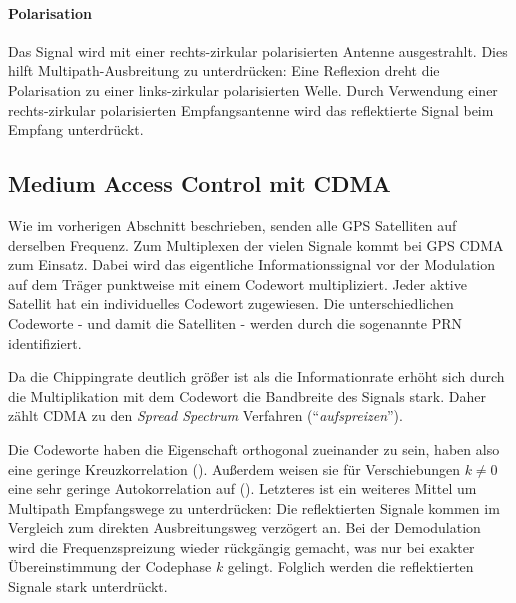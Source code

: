 
\paragraph{Polarisation} Das Signal wird mit einer rechts-zirkular polarisierten Antenne ausgestrahlt. Dies hilft Multipath-Ausbreitung zu unterdrücken: Eine Reflexion dreht die Polarisation zu einer links-zirkular polarisierten Welle. Durch Verwendung einer rechts-zirkular polarisierten Empfangsantenne wird das reflektierte Signal beim Empfang unterdrückt.

\subsection{Medium Access Control mit CDMA}
\label{basics_cdma}

Wie im vorherigen Abschnitt beschrieben, senden alle GPS Satelliten auf derselben Frequenz. Zum Multiplexen der vielen Signale kommt bei GPS \gls{CDMA} zum Einsatz. Dabei wird das eigentliche Informationssignal vor der Modulation auf dem Träger punktweise mit einem Codewort multipliziert. Jeder aktive Satellit hat ein individuelles Codewort zugewiesen. Die unterschiedlichen Codeworte - und damit die Satelliten - werden durch die sogenannte \gls{PRN} identifiziert.

Da die Chippingrate deutlich größer ist als die Informationrate erhöht sich durch die Multiplikation mit dem Codewort die Bandbreite des Signals stark. Daher zählt \gls{CDMA} zu den \emph{Spread Spectrum} Verfahren (\enquote{\emph{aufspreizen}}).

Die Codeworte haben die Eigenschaft orthogonal zueinander zu sein, haben also eine geringe Kreuzkorrelation (). Außerdem weisen sie für Verschiebungen $k\neq0$ eine sehr geringe Autokorrelation auf (). Letzteres ist ein weiteres Mittel um Multipath Empfangswege zu unterdrücken: Die reflektierten Signale kommen im Vergleich zum direkten Ausbreitungsweg verzögert an. Bei der Demodulation wird die Frequenzspreizung wieder rückgängig gemacht, was nur bei exakter Übereinstimmung der Codephase $k$ gelingt. Folglich werden die reflektierten Signale stark unterdrückt.


